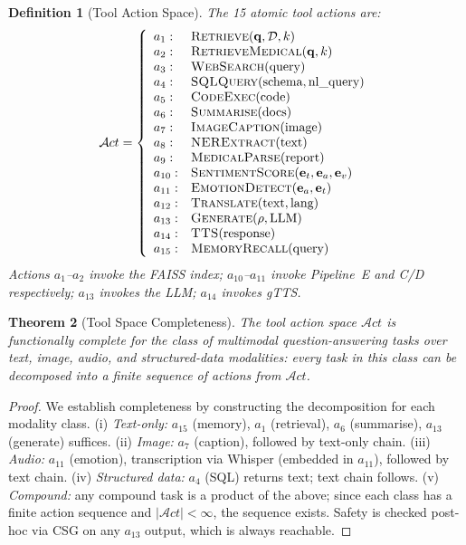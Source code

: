 \documentclass[10pt,conference]{IEEEtran}
\theoremstyle{ieeethm}
\newtheorem{theorem}{Theorem}
\theoremstyle{ieeedef}
\newtheorem{definition}[theorem]{Definition}
\theoremstyle{ieeeremark}
\begin{document}
\begin{definition}[Tool Action Space]
\label{def:tool_space}
The 15 atomic tool actions are:
\begin{equation}
\mathcal{A}ct = \left\{
\begin{array}{ll}
a_1: & \textsc{Retrieve}(\mathbf{q}, \mathcal{D}, k) \\
a_2: & \textsc{RetrieveMedical}(\mathbf{q}, k) \\
a_3: & \textsc{WebSearch}(\text{query}) \\
a_4: & \textsc{SQLQuery}(\text{schema}, \text{nl\_query}) \\
a_5: & \textsc{CodeExec}(\text{code}) \\
a_6: & \textsc{Summarise}(\text{docs}) \\
a_7: & \textsc{ImageCaption}(\text{image}) \\
a_8: & \textsc{NERExtract}(\text{text}) \\
a_9: & \textsc{MedicalParse}(\text{report}) \\
a_{10}: & \textsc{SentimentScore}(\mathbf{e}_t, \mathbf{e}_a, \mathbf{e}_v) \\
a_{11}: & \textsc{EmotionDetect}(\mathbf{e}_a, \mathbf{e}_t) \\
a_{12}: & \textsc{Translate}(\text{text}, \text{lang}) \\
a_{13}: & \textsc{Generate}(\rho, \text{LLM}) \\
a_{14}: & \textsc{TTS}(\text{response}) \\
a_{15}: & \textsc{MemoryRecall}(\text{query}) \\
\end{array}
\right.
\label{eq:tool_space}
\end{equation}
Actions $a_1$--$a_2$ invoke the FAISS index; $a_{10}$--$a_{11}$ invoke Pipeline~E and C/D respectively; $a_{13}$ invokes the LLM; $a_{14}$ invokes gTTS.
\end{definition}

\begin{theorem}[Tool Space Completeness]
\label{thm:tool_completeness}
The tool action space $\mathcal{A}ct$ is \emph{functionally complete} for the class of multimodal question-answering tasks over text, image, audio, and structured-data modalities: every task in this class can be decomposed into a finite sequence of actions from $\mathcal{A}ct$.
\end{theorem}
\begin{proof}
We establish completeness by constructing the decomposition for each modality class. (i) \emph{Text-only:} $a_{15}$ (memory), $a_1$ (retrieval), $a_6$ (summarise), $a_{13}$ (generate) suffices. (ii) \emph{Image:} $a_7$ (caption), followed by text-only chain. (iii) \emph{Audio:} $a_{11}$ (emotion), transcription via Whisper (embedded in $a_{11}$), followed by text chain. (iv) \emph{Structured data:} $a_4$ (SQL) returns text; text chain follows. (v) \emph{Compound:} any compound task is a product of the above; since each class has a finite action sequence and $|\mathcal{A}ct| < \infty$, the sequence exists. Safety is checked post-hoc via CSG on any $a_{13}$ output, which is always reachable.
\end{proof}
\end{document}
